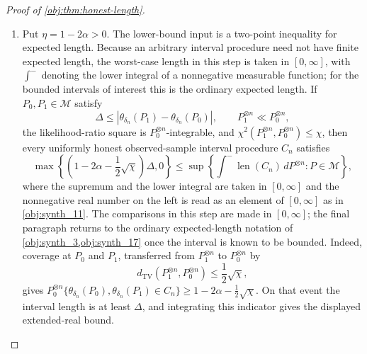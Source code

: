 \begin{proof}[Proof of \cref{obj:thm:honest-length}]
\begin{enumerate}
\[\]
By \cref{obj:lem:bandwidth-balance}, for all sufficiently large \(n\),
\[
n h_n^{2\beta+1}(\delta_n+h_n)^\kappa=1,
\qquad
0<h_n,
\qquad
h_n\le1.
\]
The effective local sample size has the following lower bound. Put
\[
\gamma_{\mathrm{bal}}=2\beta+\kappa+1 .
\]
Since \(\delta_n\ge0\), \(h_n>0\), and \(\kappa\ge0\),
\[
h_n^{\gamma_{\mathrm{bal}}}
=h_n^{2\beta+1}h_n^\kappa
\le h_n^{2\beta+1}(\delta_n+h_n)^\kappa
=n^{-1}.
\]
Because \(\gamma_{\mathrm{bal}}>0\), this gives \(h_n\le n^{-1/\gamma_{\mathrm{bal}}}\). Multiplying the balance identity by \(h_n^{-2\beta}\) gives
\[
n h_n(\delta_n+h_n)^\kappa=h_n^{-2\beta},
\]
and therefore, since \(-2\beta<0\),
\[
n^{2\beta/(2\beta+\kappa+1)}
=\left(n^{-1/\gamma_{\mathrm{bal}}}\right)^{-2\beta}
\le h_n^{-2\beta}
=n h_n(\delta_n+h_n)^\kappa .
\]
Exponential decay along this polynomial scale is eventually bounded by \(n^{-1/2}\). Combining the
exponential-decay bound with the polynomial scale bound for \(n h_n(\delta_n+h_n)^\kappa\), and using
\(h_n^\beta\le1\), yields uniformly in \(P\in\mathcal M\) and \(x\in\mathcal X\),
\[
\mathbb E_{P^{\otimes n}}D_{n,x}
\le
C_{\mathrm{rad}}
\left(n^{-1/2}+\delta_n^{\kappa+1}h_n^\beta\right).
\]
Since \(J\) is fixed, summing over strata gives the displayed \(C_{\mathrm{up}}\) bound.

\item Put \(\eta=1-2\alpha>0\). The lower-bound input is a two-point inequality for expected length.  Because an arbitrary interval procedure need not have finite expected length, the worst-case length in this step is taken in \([0,\infty]\), with \(\int^{-}\) denoting the lower integral of a nonnegative measurable function; for the bounded intervals of interest this is the ordinary expected length.
If \(P_0,P_1\in\mathcal M\) satisfy
\[
\Delta\le |\theta_{\delta_n}(P_1)-\theta_{\delta_n}(P_0)|,
\qquad
P_1^{\otimes n}\ll P_0^{\otimes n},
\]
the likelihood-ratio square is \(P_0^{\otimes n}\)-integrable, and
\(\chi^2(P_1^{\otimes n},P_0^{\otimes n})\le\chi\), then every uniformly honest observed-sample
interval procedure \(C_n\) satisfies
\[
\max\!\left\{\left(1-2\alpha-\frac12\sqrt\chi\right)\Delta,0\right\}
\le
\sup\left\{
\int^{-}\operatorname{len}(C_n)\,dP^{\otimes n}: P\in\mathcal M
\right\},
\]
where the supremum and the lower integral are taken in \([0,\infty]\) and the nonnegative real number on the left is read as an element of \([0,\infty]\) as in \cref{obj:synth_11}. The comparisons in this step are made in \([0,\infty]\); the final paragraph returns to the ordinary expected-length notation of \cref{obj:synth_3,obj:synth_17} once the interval is known to be bounded. Indeed, coverage at \(P_0\) and
\(P_1\), transferred from \(P_1^{\otimes n}\) to \(P_0^{\otimes n}\) by
\[
d_{\mathrm{TV}}(P_1^{\otimes n},P_0^{\otimes n})
\le \frac12\sqrt{\chi},
\]
gives \(P_0^{\otimes n}\{\theta_{\delta_n}(P_0),\theta_{\delta_n}(P_1)\in C_n\}\ge
1-2\alpha-\frac12\sqrt\chi\). On that event the interval length is at least \(\Delta\), and integrating
this indicator gives the displayed extended-real bound.


\end{enumerate}
\end{proof}
